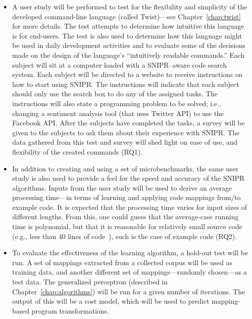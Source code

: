 \begin{itemize}  
\item A user study will be performed to test for the flexibility and simplicity of the developed command-line language (called Twist)---see Chapter~\ref{chap:twist} for more details. The test attempts to determine how intuitive this language is for end-users. The test is also used to determine how this language might be used in daily development activities and to evaluate some of the decisions made on the design of the language's ``intuitively readable commands.'' Each subject will sit at a computer loaded with a \uppercase{SnipR}--aware code search system. Each subject will be directed to a website to receive instructions on how to start using \uppercase{SnipR}. The instructions will indicate that each subject should only use the search box to do any of the assigned tasks. The instructions will also state a programming problem to be solved; i.e., changing a sentiment analysis tool (that uses Twitter API) to use the Facebook API. After the subjects have completed the tasks, a survey will be given to the subjects to ask them about their experience with \uppercase{SnipR}. The data gathered from this test and survey will shed light on ease of use, and flexibility of the created commands (RQ1).

\item In addition to creating and using a set of microbenchmarks, the same user study is also used to provide a feel for the speed and accuracy of the  \uppercase{SnipR} algorithms. Inputs from the user study will be used to derive an average processing time---in terms of learning and applying code mappings from/to example code. It is expected that the processing time varies for input sizes of different lengths. From this, one could guess that the average-case running time is polynomial, but that it is reasonable for relatively small source code (e.g., less than 40 lines of code~\cite{Brandt:2009ew}), such is the case of example code (RQ2). 

\item To evaluate the effectiveness of the learning algorithm, a hold-out test will be run. A set of mappings extracted from a collected corpus will be used as training data, and another different set of mappings---randomly chosen---as a test data. The generalized perceptron (described in Chapter~\ref{chap:algorithms}) will be run for a given number of iterations. The output of this will be a cost model, which will be used to predict mapping-based program transformations.


\end{itemize}
